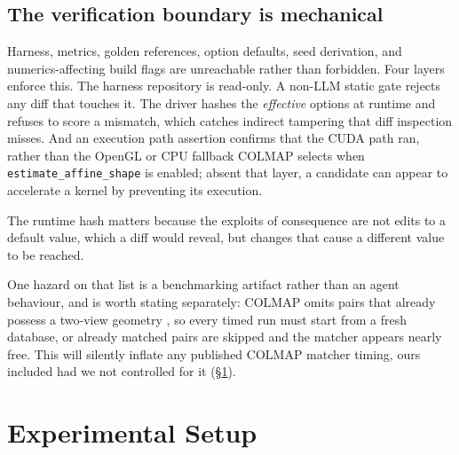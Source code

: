 \documentclass[conference]{IEEEtran}
\newcommand{\opt}[1]{\texttt{#1}}
\begin{document}
\subsection{The verification boundary is mechanical}
\label{sec:boundary}

Harness, metrics, golden references, option defaults, seed derivation, and
numerics-affecting build flags are unreachable rather than forbidden. Four
layers enforce this. The harness repository is read-only. A non-LLM static gate
rejects any diff that touches it. The driver hashes the \emph{effective} options
at runtime and refuses to score a mismatch, which catches indirect tampering
that diff inspection misses. And an execution path assertion confirms that the
CUDA path ran, rather than the OpenGL or CPU fallback COLMAP selects when
\opt{estimate\_affine\_shape} is enabled; absent that layer, a candidate can
appear to accelerate a kernel by preventing its execution.

The runtime hash matters because the exploits of consequence are not edits to a
default value, which a diff would reveal, but changes that cause a different
value to be reached.

One hazard on that list is a benchmarking artifact rather than an agent
behaviour, and is worth stating separately: COLMAP omits pairs that already
possess a two-view geometry \cite{schoenberger2016sfm}, so every timed run must
start from a fresh database, or already matched pairs are skipped and the
matcher appears nearly free. This will silently inflate any published COLMAP
matcher timing, ours included had we not controlled for it (\S\ref{sec:setup}).


\section{Experimental Setup}
\label{sec:setup}
\end{document}
